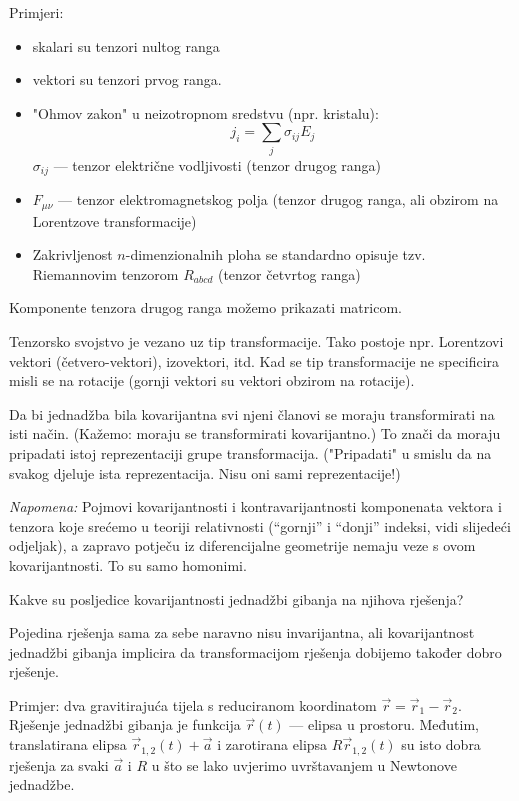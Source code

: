 Primjeri:
\begin{itemize}
\item skalari su tenzori nultog ranga
\item vektori su tenzori prvog ranga.
\item "Ohmov zakon" u neizotropnom sredstvu (npr. kristalu): 
\begin{equation*}
j_i = \sum_j \sigma_{ij} E_j
\end{equation*}
$\sigma_{ij}$ --- tenzor električne vodljivosti (tenzor drugog ranga)

\item $F_{\mu\nu}$ --- tenzor elektromagnetskog polja (tenzor drugog
ranga, ali obzirom na Lorentzove transformacije)

\item Zakrivljenost $n$-dimenzionalnih ploha se standardno opisuje
tzv. Riemannovim tenzorom $R_{abcd}$  (tenzor četvrtog ranga)
\end{itemize}



 Komponente tenzora drugog ranga možemo prikazati matricom.

 Tenzorsko svojstvo je vezano uz tip transformacije. Tako postoje
npr. Lorentzovi vektori (četvero-vektori), izovektori, itd.  Kad se tip
transformacije ne specificira misli se na rotacije (gornji
vektori su vektori obzirom na rotacije). 

 Da bi jednadžba bila kovarijantna svi njeni članovi se moraju transformirati
na isti način. (Kažemo: moraju se transformirati kovarijantno.)
To znači da moraju pripadati istoj reprezentaciji grupe transformacija.
("Pripadati" u smislu da na svakog djeluje ista reprezentacija. Nisu oni
sami reprezentacije!)


\emph{Napomena:}  Pojmovi kovarijantnosti i kontravarijantnosti
komponenata vektora i tenzora koje srećemo u teoriji relativnosti
(``gornji'' i ``donji'' indeksi, vidi slijedeći odjeljak), a 
zapravo potječu iz diferencijalne 
geometrije nemaju veze s ovom kovarijantnosti.  To su samo homonimi.
 
 Kakve su posljedice kovarijantnosti jednadžbi gibanja na njihova
rješenja?

  Pojedina rješenja sama za sebe naravno nisu invarijantna, ali 
kovarijantnost jednadžbi gibanja implicira da transformacijom rješenja
dobijemo također dobro rješenje.

Primjer: dva gravitirajuća tijela s reduciranom koordinatom $\vec{r}
= \vec{r}_1 - \vec{r}_2$. 
Rješenje jednadžbi gibanja je funkcija $\vec{r}(t)$ --- elipsa u prostoru.
Međutim, translatirana elipsa $\vec{r}_{1,2}(t)+\vec{a}$ i zarotirana
elipsa $R\vec{r}_{1,2}(t)$ su isto dobra rješenja za svaki $\vec{a}$ i $R$
u što se lako uvjerimo uvrštavanjem u Newtonove jednadžbe.

